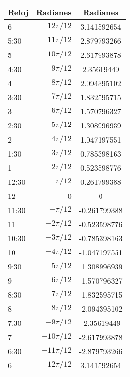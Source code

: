 \documentclass{article}
\begin{document}
	\ \\
\begin{center}          %
	\begin{tabular}{|l||r||c|}
		\hline 

		Reloj & Radianes & Radianes \\
		\hline \hline	
	6		&	$12\pi/12$	&	3.141592654	\\
	5:30	&	$11\pi/12$	&	2.879793266	\\
	5		&	$10\pi/12$	&	2.617993878	\\
	4:30	&	$9\pi/12$	&	2.35619449	\\
	4		&	$8\pi/12$	&	2.094395102	\\
	3:30	&	$7\pi/12$	&	1.832595715	\\
	3		&	$6\pi/12$	&	1.570796327	\\
	2:30	&	$5\pi/12$	&	1.308996939	\\
	2		&	$4\pi/12$	&	1.047197551	\\
	1:30	&	$3\pi/12$	&	0.785398163	\\
	1		&	$2\pi/12$	&	0.523598776	\\
	12:30	&	$\pi/12$	&	0.261799388	\\
	12		&	0			&	0		   	\\
	11:30	&	$-\pi/12$	&	-0.261799388 \\
	11		&	$-2\pi/12$	&	-0.523598776 \\
	10:30	&	$-3\pi/12$	&	-0.785398163 \\
	10		&	$-4\pi/12$	&	-1.047197551 \\
	9:30	&	$-5\pi/12$	&	-1.308996939 \\
	9		&	$-6\pi/12$	&	-1.570796327 \\
	8:30	&	$-7\pi/12$	&	-1.832595715 \\
	8		&	$-8\pi/12$	&	-2.094395102 \\
	7:30	&	$-9\pi/12$	&	-2.35619449	 \\
	7		&	$-10\pi/12$	&	-2.617993878 \\
	6:30	&	$-11\pi/12$	&	-2.879793266 \\
	6		&	$12\pi/12$	&	3.141592654	 \\		
		\hline
	\end{tabular}
\end{center}
\ \\ \ \\
	
\end{document}
